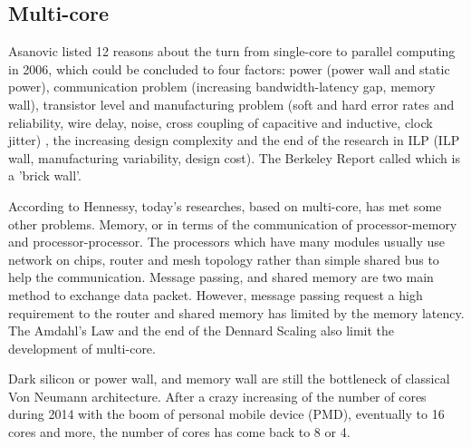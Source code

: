 \subsection{Multi-core}
Asanovic listed 12 reasons about the turn from single-core to parallel computing in 2006\cite{asanovic2006landscape}, which could be concluded to four factors: power (power wall and static power), communication problem (increasing bandwidth-latency gap, memory wall), transistor level and manufacturing problem (soft and hard error rates and reliability, wire delay, noise, cross coupling of capacitive and inductive, clock jitter) , the increasing design complexity and the end of the research in ILP (ILP wall, manufacturing variability, design cost). The Berkeley Report called which is a 'brick wall'\cite{asanovic2006landscape}.
\par According to Hennessy\cite{hennessy2017computer}, today's researches, based on multi-core, has met some other problems. Memory, or in terms of the communication of processor-memory and processor-processor. The processors which have many modules usually use network on chips, router and mesh topology rather than simple shared bus to help the communication. Message passing, and shared memory are two main method to exchange data packet. However, message passing request a high requirement to the router and shared memory has limited by the memory latency. The Amdahl's Law and the end of the Dennard Scaling also limit the development of multi-core.
\par Dark silicon or power wall, and memory wall are still the bottleneck of classical Von Neumann architecture. After a crazy increasing of the number of cores during 2014 with the boom of personal mobile device (PMD), eventually to 16 cores and more, the number of cores has come back to 8 or 4.

